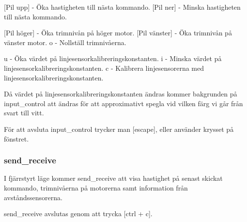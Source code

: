 [Pil upp] - Öka hastigheten till nästa kommando.
[Pil ner] - Minska hastigheten till nästa kommando.

[Pil höger] - Öka trimnivån på höger motor.
[Pil vänster] - Öka trimnivån på vänster motor.
o - Nollställ trimnivåerna.

u - Öka värdet på linjesensorkalibreringskonstanten.
i - Minska värdet på linjesensorkalibreringskonstanten.
c - Kalibrera linjesensorerna med linjesensorkalibreringskonstanten.

Då värdet på linjesensorkalibreringskonstanten ändras kommer bakgrunden på
input\_control att ändras för att approximativt spegla vid vilken färg vi går
från svart till vitt.

För att avsluta input\_control trycker man [escape], eller använder krysset på
fönstret.

\subsubsection{send\_receive}
I fjärrstyrt läge kommer send\_receive att visa hastighet på senast skickat
kommando, trimnivåerna på motorerna samt information från avståndssensorerna.

send\_receive avslutas genom att trycka [ctrl + c].

